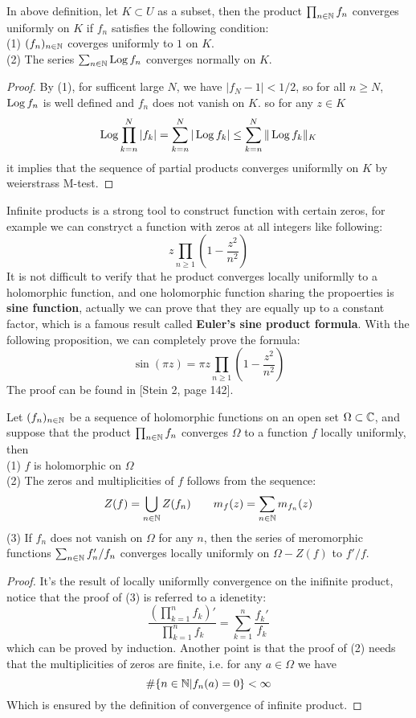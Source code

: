 \documentclass[12pt,a4paper]{article}
\begin{document}
\begin{lemma}
    In above definition, let \(K \subset U\) as a subset, then the product \(\prod_{n \in \mathbb{N}} f_n\) converges uniformly on \(K\) if \(f_n\) satisfies the following condition:\\
    (1) \((f_n)_{n \in \mathbb{N}}\) coverges uniformly to \(1\) on \(K\).\\
    (2) The series \(\sum_{n \in \mathbb{N}}\operatorname{Log} f_n\) converges normally on \(K\).

    \begin{proof}
        By (1), for sufficent large \(N\), we have \(|f_N - 1| < 1/2\), so for all \(n \geq N\), \(\operatorname{Log} f_n\) is well defined and  \(f_n\) does not vanish on \(K\). so for any \(z \in K\)
        \[\operatorname{Log} \prod_{k=n}^N |f_k| = \sum_{k=n}^N |\operatorname{Log} f_k| \leq \sum_{k=n}^N \|\operatorname{Log} f_k\|_{K}\]
        it implies that the sequence of partial products converges uniformlly on \(K\) by weierstrass M-test. 
    \end{proof}
\end{lemma}

Infinite products is a strong tool to construct function with certain zeros, for example we can constryct a function with zeros at all integers like following:
\[z \prod_{n \geq 1} (1 - \frac{z^2}{n^2})\]
It is not difficult to verify that he product converges locally uniformlly to a holomorphic function, and one holomorphic function sharing the propoerties is \textbf{sine function}, actually we can prove that they are equally up to a constant factor, which is a famous result called \textbf{Euler's sine product formula}. With the following proposition, we can completely prove the formula:
\[\sin(\pi z) = \pi z \prod_{n \geq 1} (1 - \frac{z^2}{n^2})\]
The proof can be found in [Stein 2, page 142].
\begin{proposition}
    Let \((f_n)_{n \in \mathbb{N}}\) be a sequence of holomorphic functions on an open set \(\Omega \subset \mathbb{C}\), and suppose that the product \(\prod_{n \in \mathbb{N}} f_n\) converges  \(\Omega\) to a function \(f\) locally uniformly, then\\
    (1) \(f\) is holomorphic on \(\Omega\)\\
    (2) The zeros and multiplicities of \(f\) follows from the sequence:
    \[Z(f) = \bigcup_{n \in \mathbb{N}} Z(f_n) \qquad m_f(z)= \sum_{n \in \mathbb{N}} m_{f_n}(z)\] 
    (3) If \(f_n\) does not vanish on \(\Omega\) for any \(n\), then the series of meromorphic functions \(\sum_{n \in \mathbb{N}} f_n'/f_n\) converges locally uniformly on \(\Omega - Z(f)\) to \(f'/f\).
\end{proposition}
\begin{proof}
    It's the result of locally uniformlly convergence on the inifinite product, notice that the proof of (3) is referred to a idenetity:
    \[\frac{(\prod_{k=1}^nf_k)'}{\prod_{k=1}^nf_k} = \sum_{k=1}^n \frac{f_k'}{f_k}\]
    which can be proved by induction. Another point is that the proof of (2) needs that the multiplicities of zeros are finite, i.e. for any \(a \in \Omega\) we have
    \[\#\{n\in \mathbb{N} | f_n(a) = 0\} < \infty\]
    Which is ensured by the definition of convergence of infinite product.
\end{proof}
\end{document}
